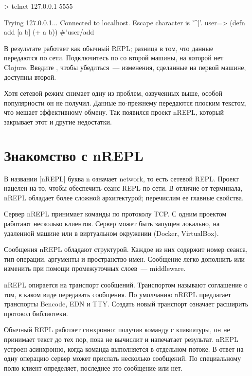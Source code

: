 \begin{english}
  \begin{text}
> telnet 127.0.0.1 5555

Trying 127.0.0.1...
Connected to localhost.
Escape character is '^]'.
user=> (defn add [a b] (+ a b))
#'user/add
  \end{text}
\end{english}

В результате  работает как обычный REPL; разница в том, что данные передаются по сети. Подключитесь по  со второй машины, на которой нет Clojure. Введите , чтобы убедиться~--- изменения, сделанные на первой машине, доступны второй.

Хотя сетевой режим снимает одну из проблем, озвученных выше, особой популярности он не получил. Данные по-прежнему передаются плоским текстом, что мешает эффективному обмену. Так появился проект nREPL, который закрывает этот и другие недостатки.

\section{Знакомство с nREPL}

\def\urlnreplorg{https://nrepl.org}

В названии \footurl{nREPL}{\urlnreplorg}[nREPL] буква n означает network, то есть сетевой REPL. Проект нацелен на то, чтобы обеспечить сеанс REPL по сети. В отличие от терминала, nREPL обладает более сложной архитектурой; перечислим ее главные свойства.

Сервер nREPL принимает команды по протоколу TCP. С одним проектом работают несколько клиентов. Сервер может быть запущен локально, на удаленной машине или в виртуальном окружении (Docker, VirtualBox).

Сообщения nREPL обладают структурой. Каждое из них содержит номер сеанса, тип операции, аргументы и пространство имен. Сообщение легко дополнить или изменить при помощи промежуточных слоев~--- middleware.

nREPL опирается на транспорт сообщений. Транспортом называют соглашение о том, в каком виде передавать сообщения. По умолчанию nREPL предлагает транспорты Bencode, EDN и TTY. Создать новый транспорт означает расширить протокол библиотеки.

Обычный REPL работает синхронно: получив команду с клавиатуры, он не принимает текст до тех пор, пока не вычислит и напечатает результат. nREPL устроен асинхронно, когда команда выполняется в отдельном потоке. В ответ на одну операцию сервер может прислать несколько сообщений. По специальному полю клиент определяет, последнее это сообщение или нет.

